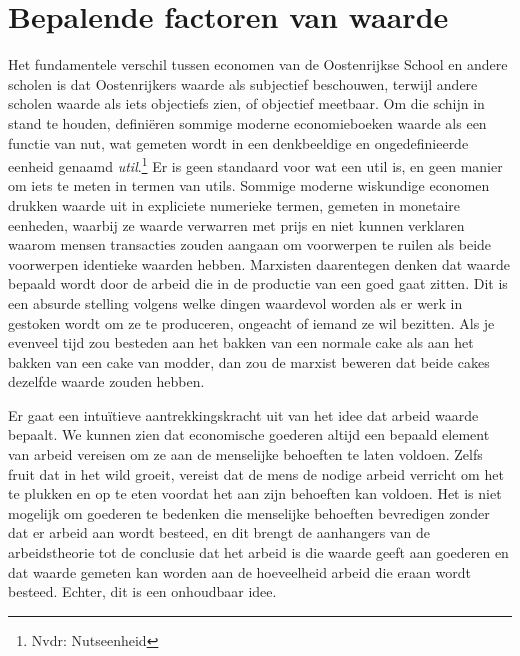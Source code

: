 \section{Bepalende factoren van waarde}

Het fundamentele verschil tussen economen van de Oostenrijkse School en andere scholen is dat Oostenrijkers waarde als subjectief beschouwen, terwijl andere scholen waarde als iets objectiefs zien, of objectief meetbaar. Om die schijn in stand te houden, definiëren sommige moderne economieboeken waarde als een functie van nut, wat gemeten wordt in een denkbeeldige en ongedefinieerde eenheid genaamd \textit{util}.\footnote{Nvdr: Nutseenheid} Er is geen standaard voor wat een util is, en geen manier om iets te meten in termen van utils. Sommige moderne wiskundige economen drukken waarde uit in expliciete numerieke termen, gemeten in monetaire eenheden, waarbij ze waarde verwarren met prijs en niet kunnen verklaren waarom mensen transacties zouden aangaan om voorwerpen te ruilen als beide voorwerpen identieke waarden hebben. Marxisten daarentegen denken dat waarde bepaald wordt door de arbeid die in de productie van een goed gaat zitten. Dit is een absurde stelling volgens welke dingen waardevol worden als er werk in gestoken wordt om ze te produceren, ongeacht of iemand ze wil bezitten. Als je evenveel tijd zou besteden aan het bakken van een normale cake als aan het bakken van een cake van modder, dan zou de marxist beweren dat beide cakes dezelfde waarde zouden hebben.

Er gaat een intuïtieve aantrekkingskracht uit van het idee dat arbeid waarde bepaalt. We kunnen zien dat economische goederen altijd een bepaald element van arbeid vereisen om ze aan de menselijke behoeften te laten voldoen. Zelfs fruit dat in het wild groeit, vereist dat de mens de nodige arbeid verricht om het te plukken en op te eten voordat het aan zijn behoeften kan voldoen. Het is niet mogelijk om goederen te bedenken die menselijke behoeften bevredigen zonder dat er arbeid aan wordt besteed, en dit brengt de aanhangers van de arbeidstheorie tot de conclusie dat het arbeid is die waarde geeft aan goederen en dat waarde gemeten kan worden aan de hoeveelheid arbeid die eraan wordt besteed. Echter, dit is een onhoudbaar idee. 

